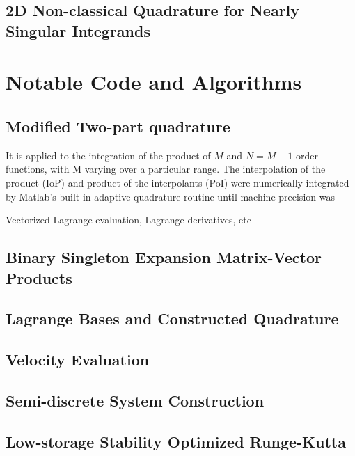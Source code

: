 \documentclass[letterpaper,12pt]{report}
\begin{document}
\section{2D Non-classical Quadrature for Nearly Singular Integrands}
\chapter{Notable Code and Algorithms}\label{Algs}
\section{Modified Two-part quadrature}

It is applied to the integration of the product of $M$ and $N=M-1$ order functions, with M varying over a particular range. The interpolation of the product (IoP) and product of the interpolants (PoI) were numerically integrated by Matlab's built-in adaptive quadrature routine until machine precision was 

Vectorized Lagrange evaluation, Lagrange derivatives, etc
\newpage
\section{Binary Singleton Expansion Matrix-Vector Products}
\section{Lagrange Bases and Constructed Quadrature}
\newpage
\section{Velocity Evaluation}
\section{Semi-discrete System Construction}
\newpage
\section{Low-storage Stability Optimized Runge-Kutta}
\end{document}
